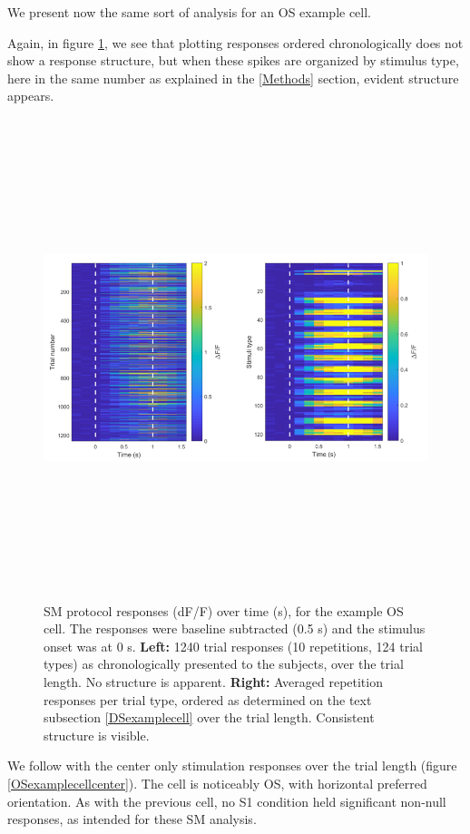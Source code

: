 We present now the same sort of analysis for an OS example cell.

Again, in figure \ref{individualOStrials}, we see that plotting responses ordered chronologically does not show a response structure, but when these spikes are organized by stimulus type, here in the same number as explained in the \ref{Methods} section, evident structure appears.
\begin{figure}[H] \centering \includegraphics[width=14cm,height=14cm,keepaspectratio]{Figures/7.Results/individualSM/roi_46_mf379_pos2/roi46.png} 
\caption{SM protocol responses (dF/F) over time (s), for the example OS cell. The responses were baseline subtracted (0.5 s) and the stimulus onset was at 0 s.
\newline \textbf{Left:} 1240 trial responses (10 repetitions, 124 trial types) as chronologically presented to the subjects, over the trial length. No structure is apparent.
\newline \textbf{Right:} Averaged repetition responses per trial type, ordered as determined on the text subsection \ref{DSexamplecell} over the trial length. Consistent structure is visible. \label{individualOStrials}}
\end{figure}

We follow with the center only stimulation responses over the trial length (figure \ref{OSexamplecellcenter}). The cell is noticeably OS, with horizontal preferred orientation. As with the previous cell, no S1 condition held significant non-null responses, as intended for these SM analysis.

